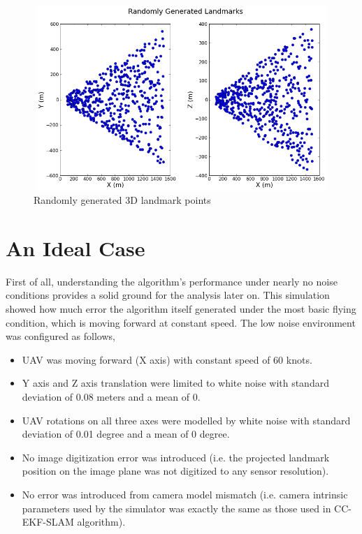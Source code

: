 \begin{figure}[h]
\centering
\includegraphics[width=12cm, height=7cm]{./Figures/SimulationFigures/Figure51.png}
\caption{Randomly generated 3D landmark points}
\label{fig:simfig51}
\end{figure}
\FloatBarrier

\section{An Ideal Case}
First of all, understanding the algorithm's performance under nearly
no noise conditions provides a solid ground for the analysis later on.
This simulation showed how much error the algorithm itself generated under
the most basic flying condition, which is moving forward at constant
speed. The low noise environment was configured as follows,

\begin{itemize}
  \item UAV was moving forward (X axis) with constant speed of 60 knots. 
  \item Y axis and Z axis translation were limited to white noise with
  standard deviation of 0.08 meters and a mean of 0.
  \item UAV rotations on all three axes were modelled by white noise with standard
  deviation of 0.01 degree and a mean of 0 degree.
  \item No image digitization error was introduced (i.e. the projected
  landmark position on the image plane was not digitized to any sensor
  resolution).
  \item No error was introduced from camera model mismatch (i.e.
  camera intrinsic parameters used by the simulator was exactly the
  same as those used in CC-EKF-SLAM algorithm).
\end{itemize}

